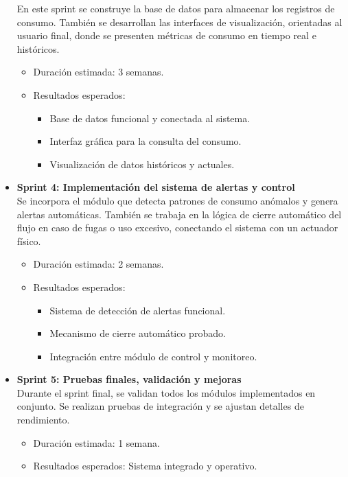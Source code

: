 \documentclass[conference]{IEEEtran}
\begin{document}
\begin{itemize}
          En este sprint se construye la base de datos para almacenar los registros de consumo. También se desarrollan las interfaces de visualización, orientadas al usuario final, donde se presenten métricas de consumo en tiempo real e históricos.
          \begin{itemize}
              \item Duración estimada: 3 semanas.
              \item Resultados esperados:
                    \begin{itemize}
                        \item Base de datos funcional y conectada al sistema.
                        \item Interfaz gráfica para la consulta del consumo.
                        \item Visualización de datos históricos y actuales.
                    \end{itemize}
          \end{itemize}
    \item \textbf{Sprint 4: Implementación del sistema de alertas y control}\\
          Se incorpora el módulo que detecta patrones de consumo anómalos y genera alertas automáticas. También se trabaja en la lógica de cierre automático del flujo en caso de fugas o uso excesivo, conectando el sistema con un actuador físico.
          \begin{itemize}
              \item Duración estimada: 2 semanas.
              \item Resultados esperados:
                    \begin{itemize}
                        \item Sistema de detección de alertas funcional.
                        \item Mecanismo de cierre automático probado.
                        \item Integración entre módulo de control y monitoreo.
                    \end{itemize}
          \end{itemize}
    \item \textbf{Sprint 5: Pruebas finales, validación y mejoras}\\
          Durante el sprint final, se validan todos los módulos implementados en conjunto. Se realizan pruebas de integración y se ajustan detalles de rendimiento.
          \begin{itemize}
              \item Duración estimada: 1 semana.
              \item Resultados esperados: Sistema integrado y operativo.
          \end{itemize}

\end{itemize}
\end{document}
